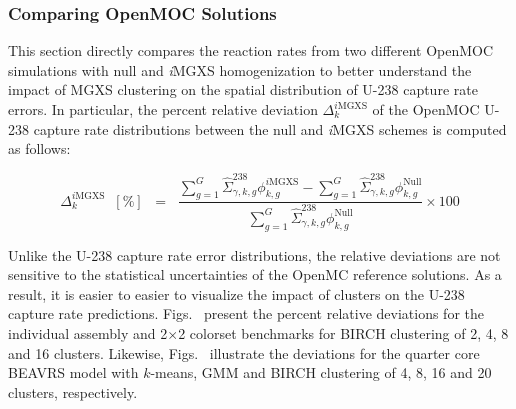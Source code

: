 \clearpage

\subsubsection{Comparing OpenMOC Solutions}
\label{subsec:chap11-imgxs-capt-rates-compare}

This section directly compares the reaction rates from two different OpenMOC simulations with null and \textit{i}\ac{MGXS} homogenization to better understand the impact of \ac{MGXS} clustering on the spatial distribution of U-238 capture rate errors. In particular, the percent relative deviation $\Delta_{k}^{\mathrm{\textit{i}MGXS}}$ of the OpenMOC U-238 capture rate distributions between the null and \textit{i}\ac{MGXS} schemes is computed as follows:

\begin{equation}
\label{eqn:chap11-compare-openmoc}
\Delta_{k}^{\mathrm{\textit{i}MGXS}} \;\; [\%] \;\; = \;\; \frac{\displaystyle\sum\limits_{g=1}^{G} \hat{\Sigma}^{238}_{\gamma,k,g}\phi_{k,g}^{\mathrm{\textit{i}MGXS}} - \displaystyle\sum\limits_{g=1}^{G} \hat{\Sigma}^{238}_{\gamma,k,g}\phi_{k,g}^{\mathrm{Null}}}{\displaystyle\sum\limits_{g=1}^{G} \hat{\Sigma}^{238}_{\gamma,k,g}\phi_{k,g}^{\mathrm{Null}}} \times 100
\end{equation}

\noindent Unlike the U-238 capture rate error distributions, the relative deviations are not sensitive to the statistical uncertainties of the OpenMC reference solutions. As a result, it is easier to easier to visualize the impact of clusters on the U-238 capture rate predictions. Figs.~ present the percent relative deviations for the individual assembly and 2$\times$2 colorset benchmarks for BIRCH clustering of 2, 4, 8 and 16 clusters. Likewise, Figs.~ illustrate the deviations for the quarter core \ac{BEAVRS} model with $k$-means, \ac{GMM} and BIRCH clustering of 4, 8, 16 and 20 clusters, respectively.

